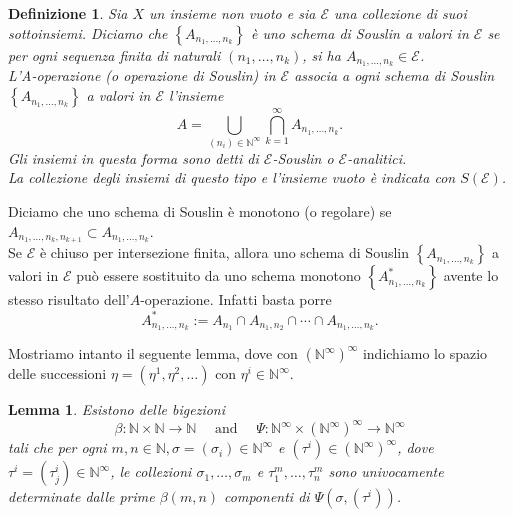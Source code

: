 \documentclass[a4paper, twoside,openright]{article}
\newcommand{\<}{\langle}
\renewcommand{\>}{\rangle}
\newtheorem{lemma}[teo]{Lemma}
\newtheorem{defin}[teo]{Definizione}
\begin{document}
\begin{defin}
	Sia $X$ un insieme non vuoto e sia $\mathcal{E}$ una collezione di suoi sottoinsiemi. Diciamo che $\left\{A_{n_{1}, \ldots, n_{k}}\right\}$ è uno schema di Souslin a valori in $\mathcal{E}$ se per ogni sequenza finita di naturali $\left(n_{1}, \ldots, n_{k}\right)$, si ha $A_{n_{1}, \ldots, n_{k}} \in \mathcal{E}$.\\
	L'A-operazione (o operazione di Souslin) in $\mathcal{E}$ associa a ogni schema di Souslin $\left\{A_{n_{1}, \ldots, n_{k}}\right\}$ a valori in $\mathcal{E}$ l'insieme
	$$
	A=\bigcup_{\left(n_{i}\right) \in \mathbb{N}^{\infty}} \bigcap_{k=1}^{\infty} A_{n_{1}, \ldots, n_{k}} .
	$$
	Gli insiemi in questa forma sono detti di $\mathcal{E}$-Souslin o $\mathcal{E}$-analitici. \\
	La collezione degli insiemi di questo tipo e l'insieme vuoto è indicata con $S(\mathcal{E})$.
\end{defin}	

Diciamo che uno schema di Souslin è monotono (o regolare) se $A_{n_{1}, \ldots, n_{k}, n_{k+1}} \subset A_{n_{1}, \ldots, n_{k}}$.\\
Se $\mathcal{E}$ è chiuso per intersezione finita, allora uno schema di Souslin $\left\{A_{n_{1}, \ldots, n_{k}}\right\}$ a valori in $\mathcal{E}$ può essere sostituito da uno schema monotono $\left\{A^*_{n_{1}, \ldots, n_{k}}\right\}$ avente lo stesso risultato dell'$A$-operazione. Infatti basta porre 
$$
A_{n_{1}, \ldots, n_{k}}^{*}:=A_{n_{1}} \cap A_{n_{1}, n_{2}} \cap \cdots \cap A_{n_{1}, \ldots, n_{k}} .
$$

Mostriamo intanto il seguente lemma, dove con $\left(\mathbb{N}^{\infty}\right)^{\infty}$ indichiamo lo spazio delle successioni $\eta=\left(\eta^{1}, \eta^{2}, \ldots\right)$ con $\eta^{i} \in \mathbb{N}^{\infty}$.

\begin{lemma}
	Esistono delle bigezioni
	$$	\beta: \mathbb{N} \times \mathbb{N} \rightarrow \mathbb{N} \quad \text { and } \quad \Psi: \mathbb{N}^{\infty} \times\left(\mathbb{N}^{\infty}\right)^{\infty} \rightarrow \mathbb{N}^{\infty}
	$$
	tali che per ogni $m, n \in \mathbb{N}, \sigma=\left(\sigma_{i}\right) \in \mathbb{N}^{\infty}$ e $\left(\tau^{i}\right) \in\left(\mathbb{N}^{\infty}\right)^{\infty}$, dove $\tau^{i}=\left(\tau_{j}^{i}\right) \in \mathbb{N}^{\infty}$, le collezioni $\sigma_{1}, \ldots, \sigma_{m}$ e $\tau_{1}^{m}, \ldots, \tau_{n}^{m}$ sono univocamente determinate dalle prime $\beta(m, n)$ componenti di $\Psi\left(\sigma,\left(\tau^{i}\right)\right)$.
\end{lemma}	
\end{document}
